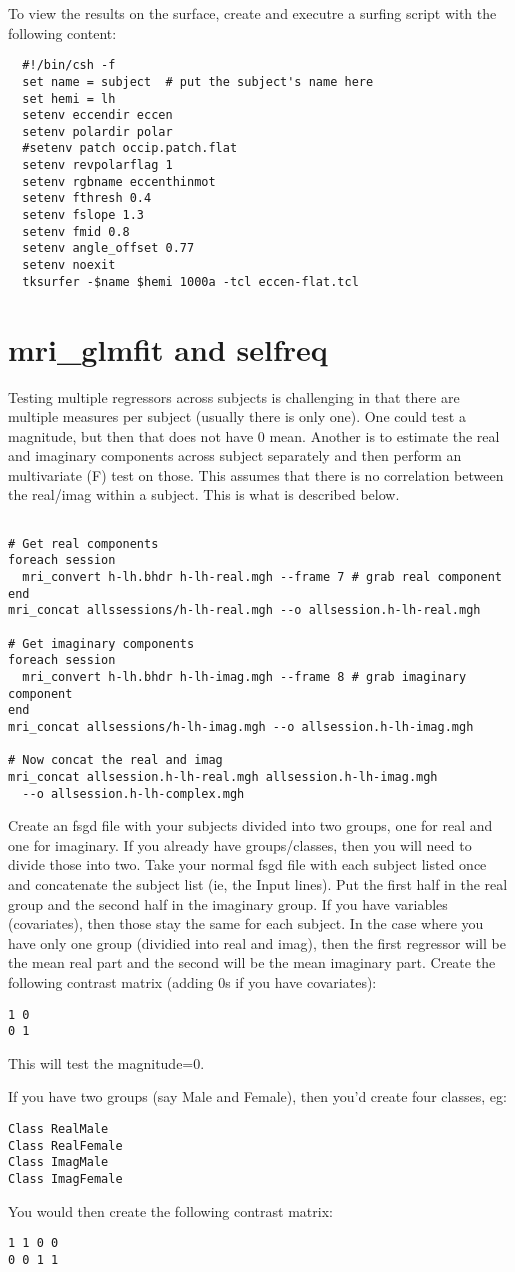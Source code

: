 \documentclass[10pt]{article}
\begin{document}
To view the results on the surface, create and executre a surfing script with the
following content:
\begin{verbatim}
  #!/bin/csh -f
  set name = subject  # put the subject's name here
  set hemi = lh
  setenv eccendir eccen
  setenv polardir polar
  #setenv patch occip.patch.flat
  setenv revpolarflag 1
  setenv rgbname eccenthinmot
  setenv fthresh 0.4
  setenv fslope 1.3
  setenv fmid 0.8
  setenv angle_offset 0.77
  setenv noexit
  tksurfer -$name $hemi 1000a -tcl eccen-flat.tcl
\end{verbatim}


\section{mri\_glmfit and selfreq}

Testing multiple regressors across subjects is challenging in that
there are multiple measures per subject (usually there is only
one). One could test a magnitude, but then that does not have 0 mean.
Another is to estimate the real and imaginary components across
subject separately and then perform an multivariate (F) test on
those. This assumes that there is no correlation between the real/imag
within a subject. This is what is described below.


\begin{verbatim}

# Get real components
foreach session
  mri_convert h-lh.bhdr h-lh-real.mgh --frame 7 # grab real component
end
mri_concat allssessions/h-lh-real.mgh --o allsession.h-lh-real.mgh

# Get imaginary components
foreach session
  mri_convert h-lh.bhdr h-lh-imag.mgh --frame 8 # grab imaginary component
end
mri_concat allsessions/h-lh-imag.mgh --o allsession.h-lh-imag.mgh

# Now concat the real and imag
mri_concat allsession.h-lh-real.mgh allsession.h-lh-imag.mgh 
  --o allsession.h-lh-complex.mgh

\end{verbatim}

Create an fsgd file with your subjects divided into two groups, one
for real and one for imaginary. If you already have groups/classes,
then you will need to divide those into two. Take your normal fsgd
file with each subject listed once and concatenate the subject list
(ie, the Input lines). Put the first half in the real group and the
second half in the imaginary group. If you have variables
(covariates), then those stay the same for each subject. In the case
where you have only one group (dividied into real and imag), then the
first regressor will be the mean real part and the second will be the
mean imaginary part. Create the following contrast matrix (adding 0s
if you have covariates):
\begin{verbatim}
1 0
0 1
\end{verbatim}
This will test the magnitude=0.

If you have two groups (say Male and Female), then you'd create four
classes, eg:
\begin{verbatim}
Class RealMale
Class RealFemale
Class ImagMale
Class ImagFemale
\end{verbatim}

You would then create the following contrast matrix:
\begin{verbatim}
1 1 0 0
0 0 1 1
\end{verbatim}
\end{document}
